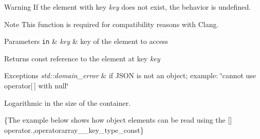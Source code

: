 \begin{DoxyWarning}{Warning}
If the element with key {\itshape key} does not exist, the behavior is undefined.
\end{DoxyWarning}
\begin{DoxyNote}{Note}
This function is required for compatibility reasons with Clang.
\end{DoxyNote}

\begin{DoxyParams}[1]{Parameters}
\mbox{\tt in}  & {\em key} & key of the element to access\\
\hline
\end{DoxyParams}
\begin{DoxyReturn}{Returns}
const reference to the element at key {\itshape key} 
\end{DoxyReturn}

\begin{DoxyExceptions}{Exceptions}
{\em std\-::domain\-\_\-error} & if J\-S\-O\-N is not an object; example\-: {\ttfamily \char`\"{}cannot use
operator\mbox{[}$\,$\mbox{]} with null\char`\"{}}\\
\hline
\end{DoxyExceptions}
Logarithmic in the size of the container.

\{The example below shows how object elements can be read using the {\ttfamily \mbox{[}\mbox{]}} operator.,operatorarray\-\_\-\-\_\-key\-\_\-type\-\_\-const\}

